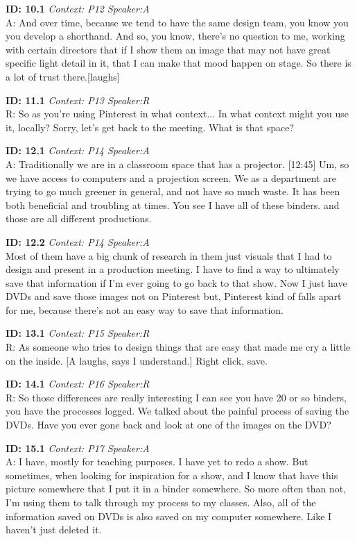 \documentclass[10pt]{book}
\begin{document}
\begin{landscape}
\textbf{ID: 10.1} \emph{Context: P12 Speaker:A}\\ 
A: And over time, because we tend to have the same design team, you know you you develop a shorthand. And so, you know, there's no question to me, working with certain directors that if I show them an image that may not have great specific light detail in it, that I can make that mood happen on stage. So there is a lot of trust there.[laughs] \newpage 

\textbf{ID: 11.1} \emph{Context: P13 Speaker:R}\\ 
R: So as you're using Pinterest in what context... In what context might you use it, locally? Sorry, let's get back to the meeting. What is that space? \newpage 

\textbf{ID: 12.1} \emph{Context: P14 Speaker:A}\\ 
A: Traditionally we are in a classroom space that has a projector. [12:45] Um, so we have access to computers and a projection screen. We as a department are trying to go much greener in general, and not have so much waste.  It has been both beneficial and troubling at times. You see I have all of these binders. and those are all different productions. \newpage 

\textbf{ID: 12.2} \emph{Context: P14 Speaker:A}\\ 
Most of them have a big chunk of research in them just visuals that I had to design and present in a production meeting. I have to find a way to ultimately save that information if I'm ever going to go back to that show. Now I just have DVDs and save those images not on Pinterest but, Pinterest kind of falls apart for me, because there's not an easy way to save that information. \newpage 

\textbf{ID: 13.1} \emph{Context: P15 Speaker:R}\\ 
R: As someone who tries to design things that are easy that made me cry a little on the inside. [A laughs, says I understand.] Right click, save. \newpage 

\textbf{ID: 14.1} \emph{Context: P16 Speaker:R}\\ 
R: So those differences are really interesting I can see you have 20 or so binders, you have the processes logged. We talked about the painful process of saving the DVDs. Have you ever gone back and look at one of the images on the DVD? \newpage 

\textbf{ID: 15.1} \emph{Context: P17 Speaker:A}\\ 
A: I have, mostly for teaching purposes. I have yet to redo a show. But sometimes, when looking for inspiration for a show, and I know that have this picture somewhere that I put it in a binder somewhere. So more often than not, I'm using them to talk through my process to my classes. Also, all of the information saved on DVDs is also saved on my computer somewhere. Like I haven't just deleted it. \newpage 


\end{landscape}
\end{document}
